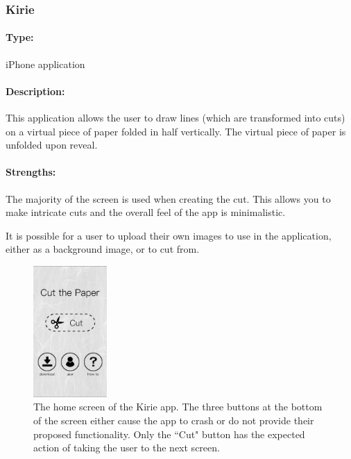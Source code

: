 \documentclass[11pt]{article}
\begin{document}
            
            \subsubsection{Kirie}
            
                \paragraph{Type:} iPhone application \cite{Kirie}

                \paragraph{Description:}
                This application allows the user to draw lines (which are transformed into cuts) on a virtual piece of paper folded in half vertically. The virtual piece of paper is unfolded upon reveal. 

                \paragraph{Strengths:}
                The majority of the screen is used when creating the cut. This allows you to make intricate cuts and the overall feel of the app is minimalistic. 
                
                It is possible for a user to upload their own images to use in the application, either as a background image, or to cut from.
                
                 \begin{figure}
                    \centering
                    \includegraphics[width=0.25\textwidth]{Images/kirieMain}
                    \caption{The home screen of the Kirie app. The three buttons at the bottom of the screen either cause the app to crash or do not provide their proposed functionality. Only the ``Cut" button has the expected action of taking the user to the next screen.}
                    \label{fig:kirieMain}
                \end{figure}
                
\end{document}
